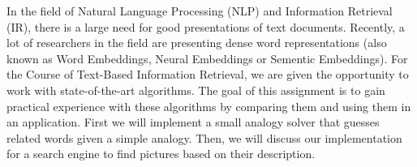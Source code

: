 In the field of Natural Language Processing (NLP) and Information Retrieval (IR), there is a large need for good presentations of text documents. Recently, a lot of researchers in the field are presenting dense word representations (also known as Word Embeddings, Neural Embeddings or Sementic Embeddings).
For the Course of Text-Based Information Retrieval, we are given the opportunity to work with state-of-the-art algorithms. The goal of this assignment is to gain practical experience with these algorithms by comparing them and using them in an application. 
First we will implement a small analogy solver that guesses related words given a simple analogy. Then, we will discuss our implementation for a search engine to find pictures based on their description.
